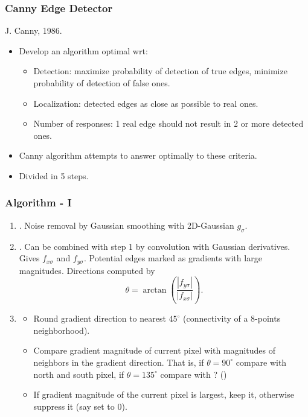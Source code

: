 \documentclass[10pt]{beamer}
\newcommand{\myemph}[1]{{\color{blue}{#1}}}
\begin{document}


\begin{frame}
  \frametitle{Canny Edge Detector}
  J. Canny, 1986.
  \begin{itemize}
  \item Develop an algorithm optimal wrt:
    \begin{itemize}
    \item Detection: maximize probability of detection of true edges, minimize probability of detection of false ones.\vfill
    \item Localization: detected edges as close as possible to real ones.\vfill
    \item Number of responses: 1 real edge should not result in 2 or
      more detected ones.\vfill
    \end{itemize}
  \item Canny algorithm attempts to answer optimally to these criteria.
  \item Divided in 5 steps.
  \end{itemize}
\end{frame}


\begin{frame}
  \frametitle{Algorithm - I}
  \begin{enumerate}
  \item \myemph{Smoothing}. Noise removal by Gaussian smoothing with 2D-Gaussian $g_\sigma$.
  \item \myemph{Gradient computation}. Can be combined with step 1 by
    convolution with Gaussian derivatives. Gives $f_{x\sigma}$ and
    $f_{y\sigma}$. Potential edges marked as gradients with large
    magnitudes. Directions computed by
    $$
    \theta = \arctan\left(\frac{|f_{y\sigma}|}{|f_{x\sigma}|}\right).
    $$
  \item \myemph{Non-maximum suppression.} 
    \begin{itemize}
    \item Round gradient direction to nearest $45^\circ$ (connectivity of a 8-points neighborhood).
    \item Compare gradient magnitude of current pixel with magnitudes
      of neighbors in the gradient direction. That is, if $\theta =
      90^\circ$ compare with north and south pixel, if $\theta =
      135^\circ$ compare with ? (\myemph{this is a question for you!}) 
    \item If gradient magnitude of the current pixel is largest, keep
      it, otherwise suppress it (say set to 0).
    \end{itemize}
  \end{enumerate}
\end{frame}
\end{document}
